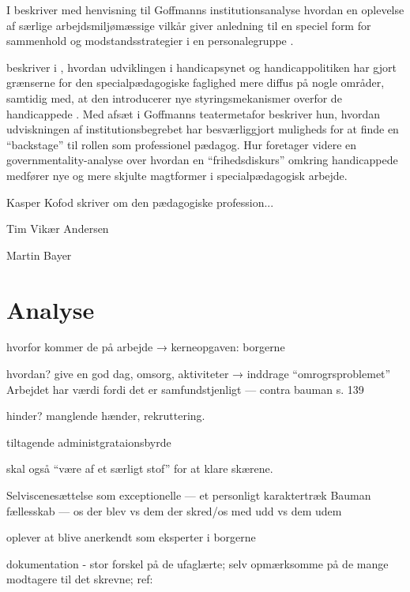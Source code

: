 I  beskriver \citeauthor{dreyerespersenBekymrendeIdentiteterAnbragte2010} med henvisning til Goffmanns institutionsanalyse hvordan en oplevelse af særlige arbejdsmiljømæssige vilkår giver anledning til en speciel form for sammenhold og modstandsstrategier i en personalegruppe \autocite{dreyerespersenBekymrendeIdentiteterAnbragte2010}.

\citeauthor{hurFrigorelsensMagt2015} beskriver i , hvordan udviklingen i handicapsynet og handicappolitiken har gjort grænserne for den specialpædagogiske faglighed mere diffus på nogle områder, samtidig med, at den introducerer nye styringsmekanismer overfor de handicappede \autocite{hurFrigorelsensMagt2015}.
Med afsæt i Goffmanns teatermetafor beskriver hun, hvordan udviskningen af institutionsbegrebet har besværliggjort muligheds for at finde en “backstage” til rollen som professionel pædagog.
Hur foretager videre en governmentality-analyse over hvordan en “frihedsdiskurs” omkring handicappede medfører nye og mere skjulte magtformer i specialpædagogisk arbejde.

Kasper Kofod skriver om den pædagogiske profession...

Tim Vikær Andersen

Martin Bayer

\section{Analyse}
hvorfor kommer de på arbejde → kerneopgaven: borgerne

hvordan? give en god dag, omsorg, aktiviteter → inddrage “omrogrsproblemet” \autocite[s.455ff]{hansbolKonstruktionAfProfessionel2008}
Arbejdet har værdi fordi det er samfundstjenligt — contra bauman s. 139

hinder? manglende hænder, rekruttering.

tiltagende administgrataionsbyrde \autocite[s. 16]{mik-meyerIndledningSkabeProfessionel2012}

skal også “være af et særligt stof” for at klare skærene.

Selviscenesættelse som exceptionelle --- et personligt karaktertræk
Bauman fællesskab — os der blev vs dem der skred/os med udd vs dem udem

oplever at blive anerkendt som eksperter i borgerne

dokumentation - stor forskel på de ufaglærte; selv opmærksomme på de mange modtagere til det skrevne; ref: \autocite{hjerrildNarViSkriver2017, andersenUndervisningInstitutionOg2019}

